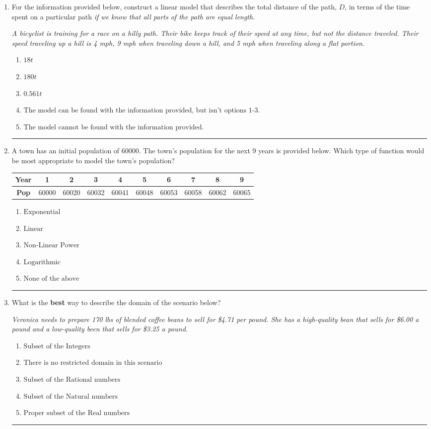 \documentclass[14pt]{extbook}
\newcommand{\litem}[1]{\item#1\hspace*{-1cm}\rule{\textwidth}{0.4pt}}
\begin{document}
\begin{enumerate}
{\begin{enumerate}[label=\Alph*.]
\end{enumerate} }
\litem{
For the information provided below, construct a linear model that describes the total distance of the path, $D$, in terms of the time spent on a particular path \textit{if we know that all parts of the path are equal length}.
\begin{center}
    \textit{ A bicyclist is training for a race on a hilly path. Their bike keeps track of their speed at any time, but not the distance traveled. Their speed traveling up a hill is 4 mph, 9 mph when traveling down a hill, and 5 mph when traveling along a flat portion. }
\end{center}
\begin{enumerate}[label=\Alph*.]
\item \( 18 t \)
\item \( 180 t \)
\item \( 0.561 t \)
\item \( \text{The model can be found with the information provided, but isn't options 1-3.} \)
\item \( \text{The model cannot be found with the information provided.} \)

\end{enumerate} }
\litem{
A town has an initial population of 60000. The town's population for the next 9 years is provided below. Which type of function would be most appropriate to model the town's population?

\begin{tabular}{c|c|c|c|c|c|c|c|c|c}
\textbf{Year} &1 &2 &3 &4 &5 &6 &7 &8 &9\tabularnewline \hline
\textbf{Pop} &60000 &60020 &60032 &60041 &60048 &60053 &60058 &60062 &60065\end{tabular}\begin{enumerate}[label=\Alph*.]
\item \( \text{Exponential} \)
\item \( \text{Linear} \)
\item \( \text{Non-Linear Power} \)
\item \( \text{Logarithmic} \)
\item \( \text{None of the above} \)

\end{enumerate} }
\litem{
What is the \textbf{best} way to describe the domain of the scenario below?
\begin{center}
    \textit{ Veronica needs to prepare 170 lbs of blended coffee beans to sell for \$4.71 per pound. She has a high-quality bean that sells for \$6.00 a pound and a low-quality been that sells for \$3.25 a pound. }
\end{center}
\begin{enumerate}[label=\Alph*.]
\item \( \text{Subset of the Integers} \)
\item \( \text{There is no restricted domain in this scenario} \)
\item \( \text{Subset of the Rational numbers} \)
\item \( \text{Subset of the Natural numbers} \)
\item \( \text{Proper subset of the Real numbers} \)


\end{enumerate}}
\end{enumerate}
\end{document}
